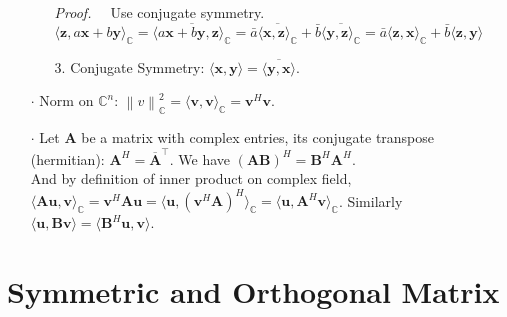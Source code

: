 \documentclass[a4paper, 11pt]{article}
\begin{document}
\begin{itemize}
\begin{itemize}
$$		$$
		\textit{Proof.~~} Use conjugate symmetry. $\langle \bm{z}, a\bm{x}+b\bm{y} \rangle_{\mathbb{C}} 
		= \overline{\langle a \bm{x}+b\bm{y}, \bm{z} \rangle_{\mathbb{C}}}
		=\bar{a}\overline{\langle \bm{x}, \bm{z} \rangle_{\mathbb{C}}}+\bar{b}\overline{\langle \bm{y}, \bm{z} \rangle_{\mathbb{C}}} 
		=\bar{a} \langle \bm{z}, \bm{x} \rangle_{\mathbb{C}} + \bar{b}\langle \bm{z}, \bm{y} \rangle$
		\item[3.] Conjugate Symmetry: $\langle \bm{x}, \bm{y} \rangle = \overline{\langle \bm{y}, \bm{x} \rangle}$.
	\end{itemize}
	\item[$\cdot$] Norm on $\mathbb{C}^n$: $\left\|v\right\|^2_{\mathbb{C}} = \langle \bm{v}, \bm{v} \rangle_{\mathbb{C}}=\bm{v}^H \bm{v}$.
	\item[$\cdot$] Let $\bm{A}$ be a matrix with complex entries, its conjugate transpose (hermitian): $\bm{A}^H = \overline{\bm{A}}^{\top}$. We have $(\bm{AB})^H = \bm{B}^H \bm{A}^H$. \\
	And by definition of inner product on complex field, $\langle \bm{Au}, \bm{v} \rangle_{\mathbb{C}} = \bm{v}^H\bm{Au}=\langle \bm{u}, (\bm{v}^H \bm{A})^H \rangle_{\mathbb{C}} = \langle \bm{u}, \bm{A}^H \bm{v} \rangle_{\mathbb{C}}$. Similarly $\langle \bm{u}, \bm{Bv} \rangle = \langle \bm{B}^H \bm{u}, \bm{v} \rangle$.
\end{itemize}


\section{Symmetric and Orthogonal Matrix}
\end{document}
